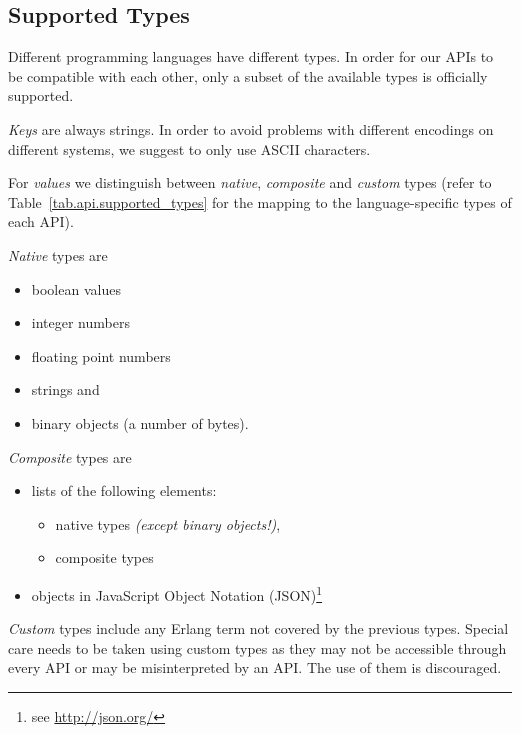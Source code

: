 \subsection{Supported Types}

Different programming languages have different types. In order for our APIs
to be compatible with each other, only a subset of the available types is
officially supported.

\emph{Keys} are always strings. In order to avoid problems with different
encodings on different systems, we suggest to only use ASCII characters.

For \emph{values} we distinguish between \emph{native}, \emph{composite}
and \emph{custom} types (refer to Table~\ref{tab.api.supported_types} for the
mapping to the language-specific types of each API).

\emph{Native} types are
\begin{itemize}
  \item boolean values
  \item integer numbers
  \item floating point numbers
  \item strings and
  \item binary objects (a number of bytes).
\end{itemize}

\emph{Composite} types are
\begin{itemize}
  \item lists of the following elements:
  \begin{itemize}
    \item native types \emph{(except binary objects!)},
    \item composite types
  \end{itemize}
  \item objects in JavaScript Object Notation (JSON)\footnote{see \url{http://json.org/}}
\end{itemize}

\emph{Custom} types include any Erlang term not covered by the previous types.
Special care needs to be taken using custom types as they may not be accessible
through every API or may be misinterpreted by an API. The use of them is
discouraged.

